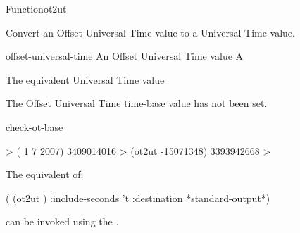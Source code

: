 \documentclass[10pt,twoside,english,pdftex]{article}
\begin{document}
\begin{functiondoc}{Function}{ot2ut}{
  \returns{} }
%

\fnsyntax

\fnpurpose Convert an Offset Universal Time value to a Universal Time 
value.

\fnpackage {}

\fnmodule {}

\fnargs
\begin{args}{offset-universal-time}
 An Offset Universal Time value
 A 
\end{args}

\fnreturns The equivalent Universal Time value

\fnerrors The Offset Universal Time time-base value has not been set.

\begin{alsos}{check-ot-base}
\also[*ot-base*]
\also[ut2ot]
\end{alsos}

\fnexample
%
\W\supp
\begin{example}
  > ( 1 7 2007)
  3409014016
  > (ot2ut -15071348)
  3393942668
  >
\end{example}

\replnote 
%
%
%
The equivalent of:
%
\W\supp
\begin{example}
  ( (ot2ut ) 
     :include-seconds 't
     :destination *standard-output*)
\end{example} 
%
can be invoked using the  .

\end{functiondoc}

\end{document}
